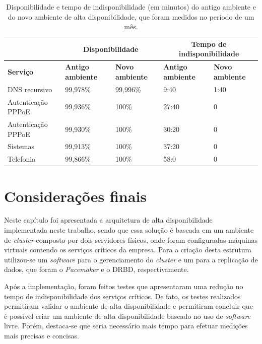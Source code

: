 \begin{table}[h!]
\caption{Disponibilidade e tempo de indisponibilidade (em minutos) do antigo ambiente e do novo ambiente de alta disponibilidade, que foram medidos no período de um mês.}
\small
\label{tab:testefinal}
\begin{center}
\begin{tabular}{|l|p{2cm}|p{2cm}|p{2cm}|p{2cm}|}\hline
 & \multicolumn{2}{|c|}{\textbf{Disponibilidade}} & \multicolumn{2}{|c|}{\textbf{Tempo de indisponibilidade}} \\\hline
\textbf{Serviço} & \textbf{Antigo ambiente} & \textbf{Novo ambiente} & \textbf{Antigo ambiente} & \textbf{Novo ambiente} \\\hline
DNS recursivo & 99,978\% & 99,996\% & 9:40 & 1:40 \\\hline
Autenticação \ac{PPPoE} & 99,936\% & 100\% & 27:40 & 0 \\\hline
Autenticação \ac{PPPoE} & 99,930\% & 100\% & 30:20 & 0 \\\hline
Sistemas & 99,913\% & 100\% & 37:20 & 0 \\\hline
Telefonia & 99,866\% & 100\% & 58:0 & 0 \\\hline
\end{tabular}
\end{center}
\end{table}


\section{Considerações finais}

Neste capítulo foi apresentada a arquitetura de alta disponibilidade implementada neste trabalho, sendo que essa solução é baseada em
um ambiente de \textit{cluster} composto por dois servidores físicos, onde foram configuradas máquinas virtuais contendo os serviços 
críticos da empresa. Para a criação desta estrutura utilizou-se um \textit{software} para o gerenciamento do \textit{cluster} e um 
para a replicação de dados, que foram o \textit{Pacemaker} e o \ac{DRBD}, respectivamente.

Após a implementação, foram feitos testes que apresentaram uma redução no tempo de indisponibilidade dos serviços críticos. 
De fato, os testes realizados permitiram validar o ambiente de alta disponibilidade e permitiram concluir que é possível criar um ambiente 
de alta disponibilidade baseado no uso de \textit{software} livre. 
Porém, destaca-se que seria necessário mais tempo para efetuar medições mais precisas e concisas.

